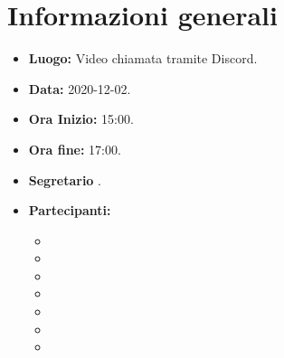 \documentclass[12pt]{article}
\begin{document}
	
	
	
	
	
	\newpage
	\tableofcontents
	\newpage
	
	\section{Informazioni generali}
	\begin{itemize}
		\item \textbf{Luogo:} Video chiamata tramite Discord.
		\item \textbf{Data:} 2020-12-02.
		\item \textbf{Ora Inizio:} 15:00.
		\item \textbf{Ora fine:} 17:00.
		\item \textbf{Segretario} \SB.
		\item \textbf{Partecipanti:}
		\begin{itemize}
			\item \MB
			\item \VAS
			\item \FD
			\item \NM
			\item \SB
			\item \GB
			\item \MDI
		\end{itemize}	
	\end{itemize}
	
	
	\newpage
	
	
	
\newpage	
	
	
\end{document}
